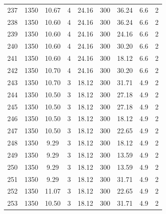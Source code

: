 \documentclass[11pt,twocolumn]{article}
\begin{document}
\begin{center}
\begin{tabular}{ccccccccc}
237    &       1350 &     10.67 &             4 &     24.16 &       300 &       36.24 &                6.6 &           2 \\
238    &       1350 &     10.60 &             4 &     24.16 &       300 &       36.24 &                6.6 &           2 \\
239    &       1350 &     10.60 &             4 &     24.16 &       300 &       24.16 &                6.6 &           2 \\
240    &       1350 &     10.60 &             4 &     24.16 &       300 &       30.20 &                6.6 &           2 \\
241    &       1350 &     10.60 &             4 &     24.16 &       300 &       18.12 &                6.6 &           2 \\
242    &       1350 &     10.70 &             4 &     24.16 &       300 &       30.20 &                6.6 &           2 \\
243    &       1350 &     10.70 &             3 &     18.12 &       300 &       31.71 &                4.9 &           2 \\
244    &       1350 &     10.50 &             3 &     18.12 &       300 &       27.18 &                4.9 &           2 \\
245    &       1350 &     10.50 &             3 &     18.12 &       300 &       27.18 &                4.9 &           2 \\
246    &       1350 &     10.50 &             3 &     18.12 &       300 &       18.12 &                4.9 &           2 \\
247    &       1350 &     10.50 &             3 &     18.12 &       300 &       22.65 &                4.9 &           2 \\
248    &       1350 &       9.29 &             3 &     18.12 &       300 &       18.12 &                4.9 &           2 \\
249    &       1350 &       9.29 &             3 &     18.12 &       300 &       13.59 &                4.9 &           2 \\
250    &       1350 &       9.29 &             3 &     18.12 &       300 &       13.59 &                4.9 &           2 \\
251    &       1350 &       9.29 &             3 &     18.12 &       300 &       31.71 &                4.9 &           2 \\
252    &       1350 &     11.07 &             3 &     18.12 &       300 &       22.65 &                4.9 &           2 \\
253    &       1350 &     10.50 &             3 &     18.12 &       300 &       31.71 &                4.9 &           2 \\
\bottomrule
\end{tabular}
\end{center}
\end{document}
